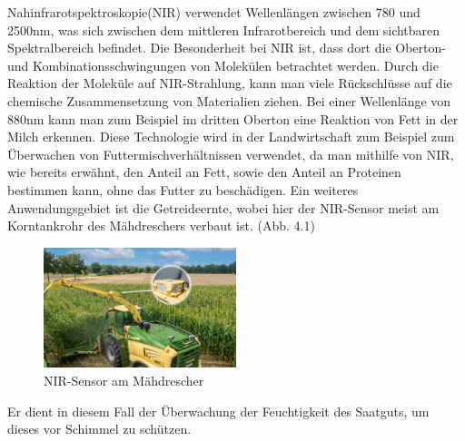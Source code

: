 Nahinfrarotspektroskopie(NIR) verwendet Wellenlängen zwischen 780 und 2500nm,
was sich zwischen dem mittleren Infrarotbereich und dem sichtbaren
Spektralbereich befindet. Die Besonderheit bei NIR ist, dass dort die
Oberton-und Kombinationsschwingungen von Molekülen betrachtet werden.
\cite{shenk2001application} Durch die Reaktion der Moleküle auf NIR-Strahlung,
kann man viele Rückschlüsse auf die chemische Zusammensetzung von Materialien
ziehen. Bei einer Wellenlänge von 880nm kann man zum Beispiel im dritten
Oberton eine Reaktion von Fett in der Milch erkennen. \cite{cen2007theory}
Diese Technologie wird in der Landwirtschaft zum Beispiel zum Überwachen von
Futtermischverhältnissen verwendet, da man mithilfe von NIR, wie bereits
erwähnt, den Anteil an Fett, sowie den Anteil an Proteinen bestimmen kann, ohne
das Futter zu beschädigen. Ein weiteres Anwendungsgebiet ist die Getreideernte,
wobei hier der NIR-Sensor meist am Korntankrohr des Mähdreschers verbaut ist.
(Abb. 4.1) 

\begin{figure}[ht]
	\centering
	\includegraphics[width=0.5\textwidth]{bilder/Krone NIR Control dual.jpg}
	\caption[Mähhdrescher mit NIR-Sensor]{NIR-Sensor am Mähdrescher}
	\label{fig:Mähhdrescher NIR-Sensor}
\end{figure}

Er dient in diesem Fall der Überwachung der Feuchtigkeit des Saatguts,
um dieses vor Schimmel zu schützen.